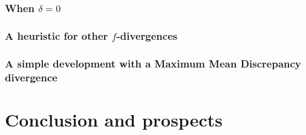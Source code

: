         \subsubsection{When $\delta=0$}

        \subsubsection{A heuristic for other $f$-divergences}

        \subsubsection{A simple development with a Maximum Mean Discrepancy divergence}

\section{Conclusion and prospects}













